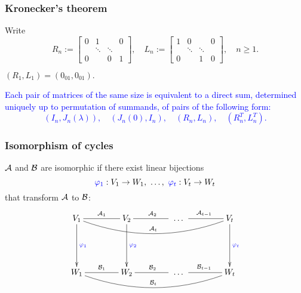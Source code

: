 \documentclass[usenames,dvipsnames]{beamer}
\renewcommand{\ge}{\geqslant}
\begin{document}
\begin{frame}
\frametitle{Kronecker's theorem}

Write
\[
R_n:=\begin{bmatrix}
0&1&&0\\&\ddots&\ddots&\\0&&0&1
\end{bmatrix},\quad
L_n:=\begin{bmatrix}
1&0&&0\\&\ddots&\ddots&\\0&&1&0
\end{bmatrix}, \quad n\ge 1.
\]

\qquad \qquad
$(R_1,L_1)=(0_{01},0_{01}).$
\bigskip

\begin{theorem}[Kronecker,  1890]
\textcolor{blue}{Each pair of matrices
of the same size is equivalent to a
direct sum, determined uniquely up to
permutation of summands, of pairs of
the following form:
\[
(I_n,J_n(\lambda )),\quad (J_n(0),I_n),\quad
(R_n,L_n),\quad (R_n^T,L_n^T).
\]}
\end{theorem}

  \end{frame}





\begin{frame}
\frametitle{\alert{Isomorphism} of
cycles}

$\cal A$ and $\cal B$ are
\alert{isomorphic} if there exist
linear bijections
$$\textcolor{blue}{\varphi _1}:V_1\to
W_1,\ \dots,\ \textcolor{blue}{\varphi _t}:V_t\to W_t$$
that transform $\cal A$ to $\cal B$:
\[
\xymatrix@R=50pt@C=40pt{
     V_1
 \ar@{->}[d]^{\textcolor{blue}{\varphi_1}}
\ar@{-}@/_1.5pc/[rrr]^{
\mathcal A_t }
\ar@{-}[r]^{\mathcal A_1}
         &
     V_2
\ar@{->}[d]^{\textcolor{blue}{\varphi_2}}
\ar@{-}[r]^{\mathcal A_2}
         &
{\ \dots\ }
         &{V_t}
\ar@{->}[d]^{\textcolor{blue}{\varphi_t}}
\ar@{-}[l]_{\mathcal A_{t-1}}
              \\
     W_1
\ar@{-}@/_1.5pc/[rrr]^{
\mathcal B_t }
\ar@{-}[r]^{\mathcal B_1}
         &
     W_2
\ar@{-}[r]^{\mathcal B_2}
         &
{\ \dots\ }
         &{W_t}
\ar@{-}[l]_{\mathcal B_{t-1}}
}
\]
\end{frame}
\end{document}
